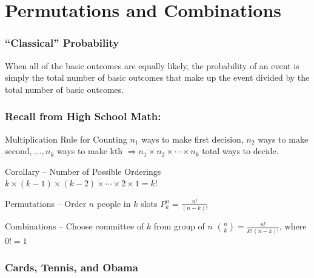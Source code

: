 \documentclass{beamer}
\begin{document}
\section{Permutations and Combinations}

\begin{frame}

\frametitle{``Classical'' Probability}

When all of the basic outcomes are equally likely, the probability of an event is simply the total number of basic outcomes that make up the event divided by the total number of basic outcomes.

\end{frame}
\begin{frame}
\frametitle{Recall from High School Math:}

\begin{block}{Multiplication Rule for Counting}
$n_1$ ways to make first decision, $n_2$ ways to make second, $\hdots, n_k$ ways to make kth $\Rightarrow n_1 \times n_2 \times \cdots \times n_k$ total ways to decide. \end{block}
\begin{block}{Corollary -- Number of Possible Orderings}
$k \times(k-1)\times (k-2) \times \cdots\times  2 \times 1 = k!$
\end{block}

\begin{block}{Permutations -- Order $n$ people in $k$ slots}
$P_k^n = \frac{n!}{(n-k)!}$\end{block}

\begin{block}{Combinations -- Choose committee of $k$ from group of $n$}
$\binom{n}{k} = \frac{n!}{k! \, (n-k)!}$, where $0! = 1$\end{block}

\end{frame}

\begin{frame}
\frametitle{Cards, Tennis, and Obama}
\end{frame}
\end{document}
